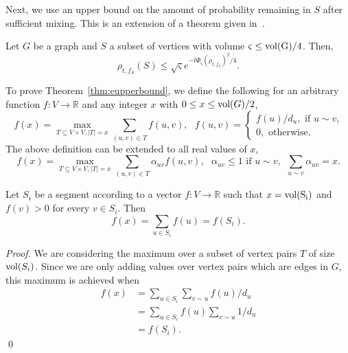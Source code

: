 \documentclass[runningheads,a4paper]{llncs}
\newcommand{\R}{\mathbb{R}}
\newcommand{\vol}{\textmd{vol}}
\begin{document}
Next, we use an upper bound on the amount of probability remaining in $S$ after
sufficient mixing.  This is an extension of a theorem given
in~\cite{chung:partitionhkpr:im09}.

\begin{theorem}
\label{thm:eupperbound}
Let $G$ be a graph and $S$ a subset of vertices with volume $\varsigma \leq
\rm{vol}(G)/4$.  Then,
\[ \rho_{t,f_S}(S) \leq \sqrt{\varsigma}e^{-t\Phi_{\varsigma}(\rho_{t,f_S})^2/4}.  \]
\end{theorem}

To prove Theorem~\ref{thm:eupperbound}, we define the following for an arbitrary
function $f:V\rightarrow \R$ and any integer $x$ with $0\leq x \leq \vol(G)/2$,
\begin{equation*}
f(x) = \max\limits_{T\subseteq V\times V, |T|=x} \sum\limits_{(u,v)\in T} f(u,v), ~~~
f(u,v)=
\begin{cases}
f(u)/d_u, \mbox{ if $u \sim v$,}\\
0, \mbox{ otherwise}.
\end{cases}
\end{equation*}
The above definition can be extended to all real values of $x$,
\begin{equation*}
f(x) = \max\limits_{T\subseteq V\times V, |T|=x} \sum\limits_{(u,v)\in T} \alpha_{uv}f(u,v), ~~~
\alpha_{uv} \leq 1 \mbox{ if }u\sim v, ~~\sum_{u\sim v}\alpha_{uv} = x.
\end{equation*}

\begin{claim}\label{claim:f}
Let $S_i$ be a segment according to a vector $f:V\rightarrow\R$ such that
$x=\rm{vol}(S_i)$ and $f(v) > 0$ for every $v\in S_i$.  Then $$f(x) = \sum_{u\in
S_i}f(u) = f(S_i).$$
\end{claim}

\begin{proof}
We are considering the maximum over a subset of vertex pairs $T$ of size
$\vol(S_i)$.  Since we are only adding values over vertex pairs which are edges
in $G$, this maximum is achieved when
\begin{align*}
f(x) &= \sum\limits_{u\in S_i}\sum\limits_{v\sim u}f(u)/d_u\\
&=\sum\limits_{u\in S_i} f(u) \sum\limits_{v\sim u}1/d_u\\
&= f(S_i).
\end{align*}
\qed\end{proof}
\end{document}
